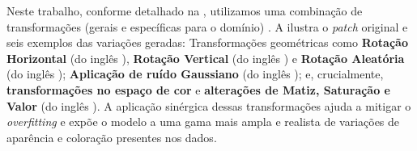 Neste trabalho, conforme detalhado na , utilizamos uma combinação de transformações (gerais e específicas para o domínio) \cite{Shorten2019}. A  ilustra o \textit{patch} original e seis exemplos das variações geradas: Transformações geométricas como \textbf{Rotação Horizontal} (do inglês ), \textbf{Rotação Vertical} (do inglês ) e \textbf{Rotação Aleatória} (do inglês ); \textbf{Aplicação de ruído Gaussiano} (do inglês ); e, crucialmente, \textbf{transformações no espaço de cor}  e \textbf{alterações de Matiz, Saturação e Valor} (do inglês ). A aplicação sinérgica dessas transformações ajuda a mitigar o \textit{overfitting} e expõe o modelo a uma gama mais ampla e realista de variações de aparência e coloração presentes nos dados.

